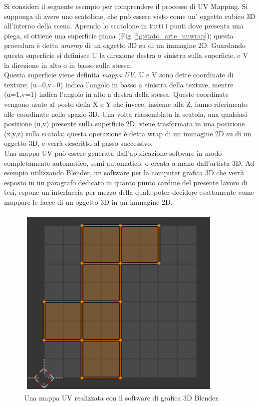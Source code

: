 Si consideri il seguente esempio per comprendere il processo di UV Mapping.
Si supponga di avere uno scatolone, che può essere visto come un’ oggetto cubico 3D all’interno della scena. Aprendo lo scatolone in tutti i punti dove presenta una piega, si ottiene una superficie piana (Fig \ref{fig:stato_arte_unwrap}); questa procedura è detta \emph{unwrap} di un oggetto 3D su di un immagine 2D. Guardando questa superficie si definisce U la direzione destra o sinistra sulla superficie, e V la direzione in alto o in basso sulla stessa. 
\\
Questa superficie viene definita \emph{mappa UV}. U e V sono dette coordinate di texture; (u=0,v=0) indica l’angolo in basso a sinistra della texture, mentre (u=1,v=1) indica l’angolo in alto a destra della stessa. Queste coordinate vengono usate al posto della X e Y che invece, insieme alla Z, fanno riferimento alle coordinate nello spazio 3D. Una volta riassemblata la scatola, una qualsiasi posizione (u,v) presente sulla superficie 2D, viene trasformata in una posizione (x,y,z) sulla scatola; questa operazione è detta wrap di un immagine 2D su di un oggetto 3D, e verrà descritto al passo successivo.
\\
Una mappa UV può essere generata dall’applicazione software in modo completamente automatico, semi automatico, o creata a mano dall’artista 3D. Ad esempio utilizzando Blender, 
un software per la computer grafica 3D che verrà esposto in un paragrafo dedicato in quanto punto cardine del presente lavoro di tesi, espone un interfaccia per mezzo della quale poter decidere esattamente come mappare le facce di un oggetto 3D in un immagine 2D. 
\\
\begin{figure}[htb]
 \centering
 \includegraphics[width=0.5\linewidth]{images/chapter_stato_arte/stato_arte_uvmap_blender.png}\hfill
 \caption[Mappa UV realizzata in Blender]{Una mappa UV realizzata con il software di grafica 3D Blender.}
 \label{fig:stato_arte_uvmap_blender}
\end{figure}
